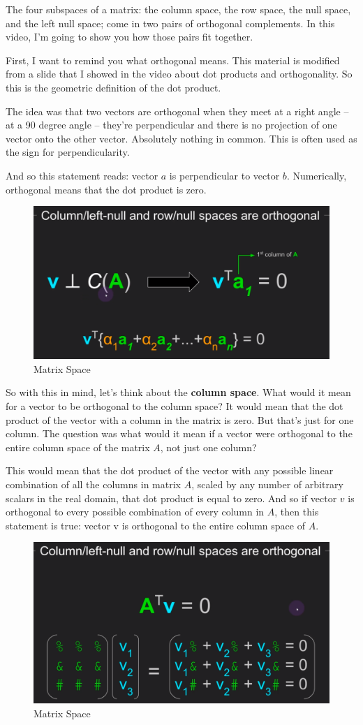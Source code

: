\documentclass[fleqn,10pt]{olplainarticle}
\theoremstyle{definition}
\theoremstyle{remark}
\begin{document}
The four subspaces of a matrix: the column space, the row space, the null space, and the left null space; come in two pairs of orthogonal complements. In this video, I'm going to show you how those pairs fit together.

First, I want to remind you what orthogonal means. This material is modified from a slide that I showed in the video about dot products and orthogonality. So this is the geometric definition of the dot product.

The idea was that two vectors are orthogonal when they meet at a right angle -- at a 90 degree angle -- they're perpendicular and there is no projection of one vector onto the other vector. Absolutely nothing in common. This is often used as the sign for perpendicularity.

And so this statement reads: vector $a$ is perpendicular to vector $b$. Numerically, orthogonal means that the dot product is zero.

\begin{figure}[ht]
	\centering
	\includegraphics[width=0.6\linewidth]{images/matrix-space-27.png}
	\caption{Matrix Space}
	\label{fig:matrix_space_27}
\end{figure}


So with this in mind, let's think about the \textbf{column space}. What would it mean for a vector to be orthogonal to the column space? It would mean that the dot product of the vector with a column in the matrix is zero. But that's just for one column. The question was what would it mean if a vector were orthogonal to the entire column space of the matrix $A$, not just one column?

This would mean that the dot product of the vector with any possible linear combination of all the columns in matrix $A$, scaled by any number of arbitrary scalars in the real domain, that dot product is equal to zero. And so if vector $v$ is orthogonal to every possible combination of every column in $A$, then this statement is true: vector v is orthogonal to the entire column space of $A$. 

\begin{figure}[ht]
	\centering
	\includegraphics[width=0.6\linewidth]{images/matrix-space-28.png}
	\caption{Matrix Space}
	\label{fig:matrix_space_28}
\end{figure}
\end{document}
